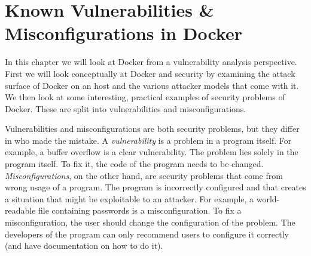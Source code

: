 \chapter{Known Vulnerabilities \& Misconfigurations in Docker}
In this chapter we will look at Docker from a vulnerability analysis perspective. First we will look conceptually at Docker and security by examining the attack surface of Docker on an host and the various attacker models that come with it.
We then look at some interesting, practical examples of security problems of Docker. These are split into vulnerabilities and misconfigurations.

\hfill

Vulnerabilities and misconfigurations are both security problems, but they differ in who made the mistake. A \emph{vulnerability} is a problem in a program itself. For example, a buffer overflow is a clear vulnerability. The problem lies solely in the program itself. To fix it, the code of the program needs to be changed. \emph{Misconfigurations}, on the other hand, are security problems that come from wrong usage of a program. The program is incorrectly configured and that creates a situation that might be exploitable to an attacker. For example, a world-readable file containing passwords is a misconfiguration. To fix a misconfiguration, the user should change the configuration of the problem. The developers of the program can only recommend users to configure it correctly (and have documentation on how to do it).

\pagebreak




